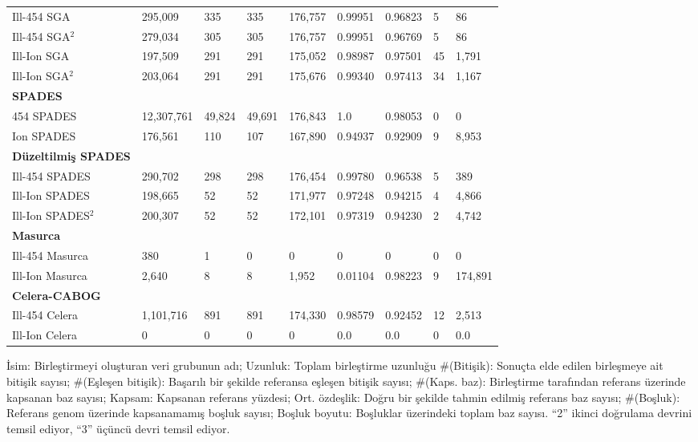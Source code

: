 \begin{table}[htb]
\begin{center}
{\begin{tabular}{|l|l|l|l|l|l|l|l|l|}
         Ill-454 SGA & 295,009 & 335 & 335 & 176,757 & 0.99951 & 0.96823 & 5 & 86 \\
         Ill-454 SGA$^2$ & 279,034 & 305 & 305 & 176,757 & 0.99951 & 0.96769 & 5 & 86 \\
         Ill-Ion SGA & 197,509 & 291 & 291 & 175,052 & 0.98987 & 0.97501 & 45 & 1,791 \\
         Ill-Ion SGA$^2$ & 203,064 & 291 & 291 & 175,676 & 0.99340 & 0.97413 & 34 & 1,167 \\
         \textbf{SPADES} & & & & & & & & \\
         454 SPADES & 12,307,761 & 49,824 & 49,691 & 176,843 & 1.0 & 0.98053 & 0 & 0 \\
         Ion SPADES & 176,561 & 110 & 107 & 167,890 & 0.94937 & 0.92909 & 9 & 8,953 \\	
         \hline
         \textbf{Düzeltilmiş SPADES} & & & & & & & & \\
         Ill-454 SPADES & 290,702 & 298 & 298 & 176,454 & 0.99780 & 0.96538 & 5 & 389 \\
         Ill-Ion SPADES & 198,665 & 52 & 52 & 171,977 & 0.97248 & 0.94215 & 4 & 4,866 \\
         Ill-Ion SPADES$^2$ & 200,307 & 52 & 52 & 172,101 & 0.97319 & 0.94230 & 2 & 4,742 \\
         \textbf{Masurca} & & & & & & & & \\
         Ill-454 Masurca & 380 & 1 & 0 & 0 & 0 & 0 & 0 & 0 \\
         Ill-Ion Masurca & 2,640 & 8 & 8 & 1,952 & 0.01104 & 0.98223 & 9 & 174,891 \\
 		\textbf{Celera-CABOG} & & & & & & & & \\
         Ill-454 Celera & 1,101,716 & 891 & 891 & 174,330 & 0.98579 & 0.92452 & 12 & 2,513 \\
         Ill-Ion Celera & 0 & 0 & 0 & 0 & 0.0 & 0.0 & 0 & 0.0 \\
\hline
\end{tabular}
}
\end{center}
{\footnotesize İsim: Birleştirmeyi oluşturan veri grubunun adı; Uzunluk: Toplam birleştirme uzunluğu \#(Bitişik): Sonuçta elde edilen birleşmeye ait bitişik sayısı; \#(Eşleşen bitişik): Başarılı bir şekilde referansa eşleşen bitişik sayısı; \#(Kaps. baz):  Birleştirme tarafından referans üzerinde kapsanan baz sayısı; Kapsam: Kapsanan referans yüzdesi; Ort. özdeşlik: Doğru bir şekilde tahmin edilmiş referans baz sayısı; \#(Boşluk): Referans genom üzerinde kapsanamamış boşluk sayısı; Boşluk boyutu: Boşluklar üzerindeki toplam baz sayısı.
  ``2'' ikinci doğrulama devrini temsil ediyor, ``3'' üçüncü devri temsil ediyor.}

\end{table}




